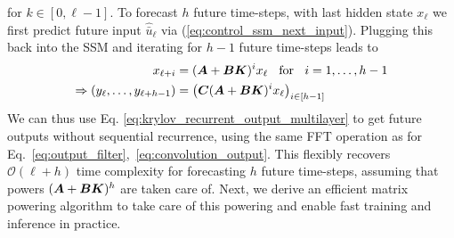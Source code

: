 for $k \in [0,\ell - 1]$.
%
To forecast $h$ future time-steps, with last hidden state $x_{\ell}$ we first predict future input $\hat{\bar{u}}_{\ell}$ via (\ref{eq:control_ssm_next_input}). Plugging this back into the SSM and iterating for $h- 1$ future time-steps leads to
\begin{align}
x_{\ell +i} &= (\boldsymbol{A}+\boldsymbol{B} \boldsymbol{K})^i x_\ell\;\; \text{ for }\;\; i = 1, \ldots, h-1 \\
\Rightarrow (y_{\ell}, \ldots, y_{\ell + h- 1}) &= \big(\boldsymbol{C}(\boldsymbol{A} + \boldsymbol{B} \boldsymbol{K})^ix_\ell \big)_{i \in [h - 1]} \label{eq:krylov_recurrent_output_multilayer} 
\end{align}
We can thus use Eq. \ref{eq:krylov_recurrent_output_multilayer} to get future outputs without sequential recurrence, using the same FFT operation as for Eq.~\ref{eq:output_filter},~\ref{eq:convolution_output}.
This flexibly recovers $\mathcal{O}(\ell + h)$ time complexity for forecasting $h$ future time-steps,
assuming that powers $(\boldsymbol{A} + \boldsymbol{B} \boldsymbol{K})^h$ are taken care of. 
Next, we derive an efficient matrix powering algorithm to take care of this powering and enable fast training and inference in practice. 




